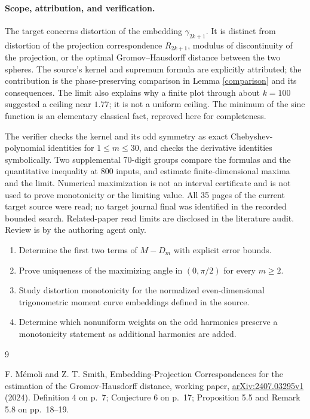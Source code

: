 \documentclass[11pt]{article}
\begin{document}
\paragraph{Scope, attribution, and verification.}
The target concerns distortion of the embedding $\gamma_{2k+1}$.
It is distinct from distortion of the projection correspondence
$R_{2k+1}$, modulus of discontinuity of the projection, or the
optimal Gromov--Hausdorff distance between the two spheres.
The source's kernel and supremum formula are explicitly attributed;
the contribution is the phase-preserving comparison in
Lemma \ref{comparison} and its consequences.
The limit also explains why a finite plot through about $k=100$
suggested a ceiling near $1.77$; it is not a uniform ceiling.
The minimum of the sinc function is an elementary classical fact,
reproved here for completeness.

The verifier checks the kernel and its odd symmetry as exact
Chebyshev-polynomial identities for $1\leq m\leq30$, and checks
the derivative identities symbolically. Two supplemental 70-digit
groups compare the formulas and the quantitative inequality at
800 inputs, and estimate finite-dimensional maxima and the limit.
Numerical maximization is not an interval certificate and is not
used to prove monotonicity or the limiting value.
All 35 pages of the current target source were read; no target
journal final was identified in the recorded bounded search.
Related-paper read limits are disclosed in the literature audit.
Review is by the authoring agent only.

\begin{enumerate}[label=\textbf{Task \arabic*:},start=2,leftmargin=*]
\item Determine the first two terms of $M-D_m$ with explicit error bounds.
\item Prove uniqueness of the maximizing angle in $(0,\pi/2)$ for every $m\geq2$.
\item Study distortion monotonicity for the normalized even-dimensional
trigonometric moment curve embeddings defined in the source.
\item Determine which nonuniform weights on the odd harmonics preserve
a monotonicity statement as additional harmonics are added.
\end{enumerate}
\small
\begin{thebibliography}{9}
\raggedright
{} F. M\'emoli and Z. T. Smith,
Embedding-Projection Correspondences for the estimation of the
Gromov-Hausdorff distance, working paper,
\href{https://arxiv.org/abs/2407.03295}{arXiv:2407.03295v1} (2024).
Definition 4 on p.~7; Conjecture 6 on p.~17;
Proposition 5.5 and Remark 5.8 on pp.~18--19.
\end{thebibliography}
\end{document}

